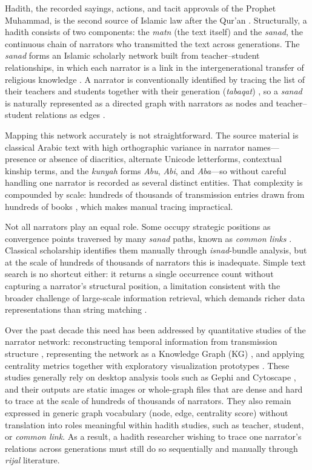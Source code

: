 \documentclass[conference]{IEEEtran}
\begin{document}
Hadith, the recorded sayings, actions, and tacit approvals of the Prophet
Muhammad, is the second source of Islamic law after the Qur'an
\cite{handayani2026hadis,hatta2026teknik}. Structurally, a hadith consists of two
components: the \textit{matn} (the text itself) and the \textit{sanad}, the
continuous chain of narrators who transmitted the text across generations. The
\textit{sanad} forms an Islamic scholarly network built from teacher--student
relationships, in which each narrator is a link in the intergenerational transfer
of religious knowledge \cite{Mustang_Abubakar_2025}. A narrator is conventionally
identified by tracing the list of their teachers and students together with their
generation (\textit{tabaqat}) \cite{WanKamalNadzif2025135}, so a \textit{sanad} is
naturally represented as a directed graph with narrators as nodes and
teacher--student relations as edges \cite{FAROOQI2024110439}.

Mapping this network accurately is not straightforward. The source material is
classical Arabic text with high orthographic variance in narrator names---presence
or absence of diacritics, alternate Unicode letterforms, contextual kinship terms,
and the \textit{kunyah} forms \textit{Abu}, \textit{Abi}, and \textit{Aba}---so
without careful handling one narrator is recorded as several distinct entities.
That complexity is compounded by scale: hundreds of thousands of transmission
entries drawn from hundreds of books \cite{MGHARI2022108540}, which makes manual
tracing impractical.

Not all narrators play an equal role. Some occupy strategic positions as
convergence points traversed by many \textit{sanad} paths, known as
\textit{common links} \cite{mufid2023track}. Classical scholarship identifies them
manually through \textit{isnad}-bundle analysis, but at the scale of hundreds of
thousands of narrators this is inadequate. Simple text search is no shortcut
either: it returns a single occurrence count without capturing a narrator's
structural position, a limitation consistent with the broader challenge of
large-scale information retrieval, which demands richer data representations than
string matching \cite{rixewa2024interleaved}.

Over the past decade this need has been addressed by quantitative studies of the
narrator network: reconstructing temporal information from transmission structure
\cite{Shuaib2022}, representing the network as a Knowledge Graph (KG)
\cite{FAROOQI2024110439}, and applying centrality metrics together with
exploratory visualization prototypes \cite{Mghari2024Narrator2Vec}. These studies
generally rely on desktop analysis tools such as Gephi and Cytoscape
\cite{FAROOQI2024110439}, and their outputs are static images or whole-graph files
that are dense and hard to trace at the scale of hundreds of thousands of
narrators. They also remain expressed in generic graph vocabulary (node, edge,
centrality score) without translation into roles meaningful within hadith studies,
such as teacher, student, or \textit{common link}. As a result, a hadith
researcher wishing to trace one narrator's relations across generations must
still do so sequentially and manually through \textit{rijal} literature.
\end{document}
